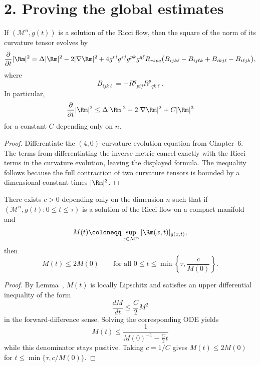 \section*{2. Proving the global estimates}

\begin{lemma}
\label{ch07-lem-curvature-norm-evolution}

If \((\mathcal M^n,g(t))\) is a solution of the Ricci flow, then the square of the norm of its curvature tensor evolves by
\[
\frac{\partial}{\partial t}|\Rm|^2
=\Delta |\Rm|^2-2|\nabla \Rm|^2
+4g^{ri}g^{sj}g^{pk}g^{q\ell}R_{rspq}\bigl(B_{ijk\ell}-B_{ij\ell k}+B_{ikj\ell}-B_{i\ell jk}\bigr),
\]
where
\[
B_{ijk\ell}=-R^q{}_{pij}R^p{}_{qk\ell}.
\]
In particular,
\[
\frac{\partial}{\partial t}|\Rm|^2\le \Delta |\Rm|^2-2|\nabla \Rm|^2+C|\Rm|^3
\]
for a constant \(C\) depending only on \(n\).
\end{lemma}

\begin{proof}
\sketch Differentiate the \((4,0)\)-curvature evolution equation from Chapter~6. The terms from differentiating the inverse metric cancel exactly with the Ricci terms in the curvature evolution, leaving the displayed formula. The inequality follows because the full contraction of two curvature tensors is bounded by a dimensional constant times \(|\Rm|^3\).
\end{proof}

\begin{corollary}
\label{ch07-cor-doubling-time-estimate}

There exists \(c>0\) depending only on the dimension \(n\) such that if \((\mathcal M^n,g(t):0\le t\le \tau)\) is a solution of the Ricci flow on a compact manifold and
\[
M(t)\coloneqq \sup_{x\in\mathcal M^n}|\Rm(x,t)|_{g(x,t)},
\]
then
\[
M(t)\le 2M(0)
\qquad\text{for all }0\le t\le \min\left\{\tau,\frac{c}{M(0)}\right\}.
\]
\end{corollary}

\begin{proof}
\sketch By Lemma~, \(M(t)\) is locally Lipschitz and satisfies an upper differential inequality of the form
\[
\frac{dM}{dt}\le \frac{C}{2}M^2
\]
in the forward-difference sense. Solving the corresponding ODE yields
\[
M(t)\le \frac{1}{M(0)^{-1}-\frac C2 t}
\]
while this denominator stays positive. Taking \(c=1/C\) gives \(M(t)\le 2M(0)\) for \(t\le \min\{\tau,c/M(0)\}\).
\end{proof}

